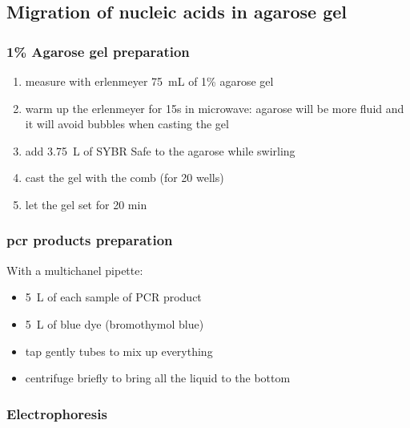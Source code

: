 \subsection{Migration of nucleic acids in agarose gel}
\label{task:20180117_cj1}


\subsubsection{1\% Agarose gel preparation}

\begin{enumerate}
\item measure with erlenmeyer 75~mL of 1\% agarose gel
\item warm up the erlenmeyer for 15s in microwave: agarose will be more fluid and it will avoid bubbles when casting the gel
\item add 3.75~\textmu L of SYBR Safe to the agarose while swirling 
\item cast the gel with the comb (for 20 wells)
\item let the gel set for 20 min
\end{enumerate}

\subsubsection{\gls{pcr} products preparation}

With a multichanel pipette:
\begin{itemize}
\item 5~\textmu L of each sample of PCR product
\item 5~\textmu L of blue dye (bromothymol blue)
\item tap gently tubes to mix up everything
\item centrifuge briefly to bring all the liquid to the bottom
\end{itemize}

\subsubsection{Electrophoresis}

